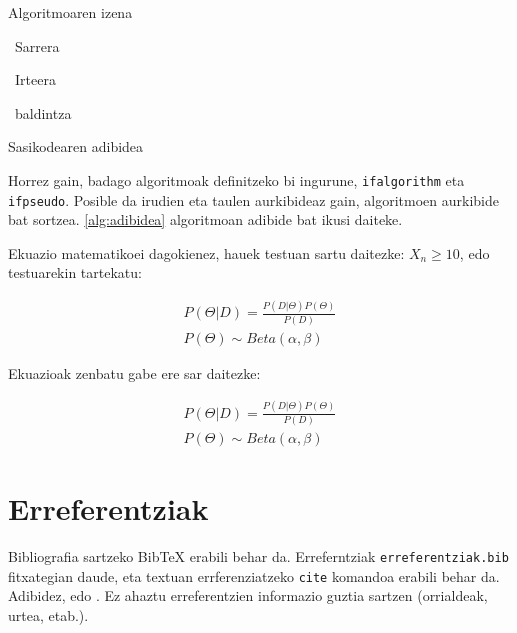 \begin{ifalgorithm}[t]
	\begin{ifpseudo}{Algoritmoaren izena}
	\item	\In\ Sarrera
	\item	\Out\ Irteera
	\item	{}
	\item	{}
	\item	\EFor
	\item	\If\ baldintza \Then
	\item	{}
	\item	{}
	\item	\T{\Done}
	\item	\Else
	\item	\T{\Do}
	\item	{}
	\item	{}
	\item	\TT{\EFor}
	\item	{}
	\item	\EIf
	\item	{}
	\item	{}
	\item	\TT{\Return}
	\item	\T{\EIf}
	\end{ifpseudo}
	\caption{Sasikodearen adibidea}\label{alg:adibidea}
\end{ifalgorithm}

Horrez gain, badago algoritmoak definitzeko bi ingurune, \texttt{ifalgorithm} eta \texttt{ifpseudo}. Posible da irudien eta taulen aurkibideaz gain, algoritmoen aurkibide bat sortzea. \ref{alg:adibidea} algoritmoan adibide bat ikusi daiteke.

Ekuazio matematikoei dagokienez, hauek testuan sartu daitezke: $X_n \geq 10$, edo testuarekin tartekatu:

\begin{eqnarray}
P(\Theta|D) = \frac{P(D|\Theta)P(\Theta)}{P(D)}\\
P(\Theta) \sim Beta(\alpha, \beta)
\end{eqnarray} 

Ekuazioak zenbatu gabe ere sar daitezke:

\begin{eqnarray*}
P(\Theta|D) = \frac{P(D|\Theta)P(\Theta)}{P(D)}\\
P(\Theta) \sim Beta(\alpha, \beta)
\end{eqnarray*} 

\section{Erreferentziak}

Bibliografia sartzeko BibTeX erabili behar da. Erreferntziak \texttt{erreferentziak.bib} fitxategian daude, eta textuan errferenziatzeko \texttt{cite} komandoa erabili behar da. Adibidez, \cite{Shahbaba2011} edo \cite{Efron1994, Rmanual, Subramanian2005gene}. Ez ahaztu erreferentzien informazio guztia sartzen (orrialdeak, urtea, etab.).

